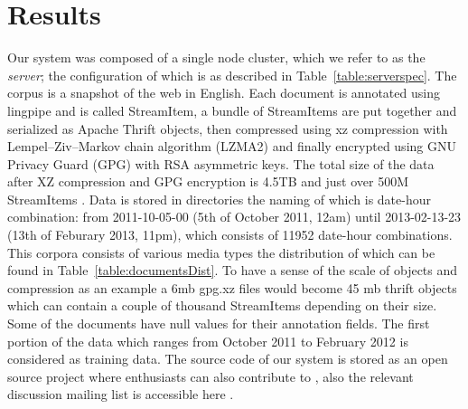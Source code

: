 
\section{Results}
\label{sec:results}

 Our system was composed of a single node cluster, which we refer to as the
 \textit{server}; the configuration of which is as described in
 Table~\ref{table:serverspec}. The corpus is a snapshot of the web in English.
 Each document is annotated using lingpipe and is called StreamItem, a bundle of 
StreamItems are put together and serialized as Apache Thrift objects, then 
compressed using xz compression with Lempel–Ziv–Markov chain algorithm (LZMA2) 
and finally encrypted using GNU Privacy Guard (GPG) with RSA asymmetric keys.
The total size of the data after XZ compression and GPG encryption is 4.5TB and
just over 500M StreamItems \cite{s3}. Data is stored in directories the naming
of which is date-hour combination: from 2011-10-05-00 (5th of October 2011, 12am)
until 2013-02-13-23 (13th of Feburary 2013, 11pm), which consists of 11952
date-hour combinations. This corpora consists of various media types the
distribution of which can be found in Table~\ref{table:documentsDist}. To have a
sense of the scale of objects and compression as an example a 6mb
gpg.xz files would become 45 mb thrift objects which can contain a couple of 
thousand StreamItems depending on their size. Some of the documents have null 
values for their annotation fields. The first portion of the data which 
ranges from October 2011 to February 2012 is considered as training data.
The source code of our system is stored as an open source project where
enthusiasts can also contribute to \cite{github}, also the relevant discussion
mailing list is accessible here \cite{googlegroups}.
 
